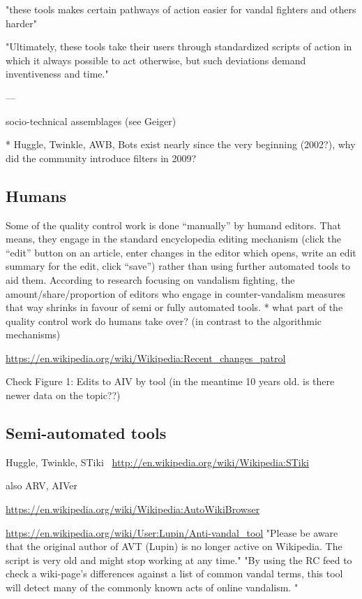 "these tools makes certain pathways of action easier for vandal
fighters and others harder"

"Ultimately, these tools take their users
through standardized scripts of action in which it always
possible to act otherwise, but such deviations demand
inventiveness and time."

---

socio-technical assemblages (see Geiger)

* Huggle, Twinkle, AWB, Bots exist nearly since the very beginning (2002?), why did the community introduce filters in 2009?

\subsection{Humans}

Some of the quality control work is done ``manually'' by humand editors.
That means, they engage in the standard encyclopedia editing mechanism (click the ``edit'' button on an article, enter changes in the editor which opens, write an edit summary for the edit, click ``save'') rather than using further automated tools to aid them.
According to research focusing on vandalism fighting, the amount/share/proportion of editors who engage in counter-vandalism measures that way shrinks in favour of semi or fully automated tools. %
* what part of the quality control work do humans take over? (in contrast to the algorithmic mechanisms)

\url{https://en.wikipedia.org/wiki/Wikipedia:Recent_changes_patrol}

\cite{GeiRib2010}
Check Figure 1: Edits to AIV by tool (in the meantime 10 years old. is there newer data on the topic??)

\subsection{Semi-automated tools}


Huggle, Twinkle, STiki~\cite{WestKanLee2010}
\url{http://en.wikipedia.org/wiki/Wikipedia:STiki}

also ARV, AIVer

\url{https://en.wikipedia.org/wiki/Wikipedia:AutoWikiBrowser}

\url{https://en.wikipedia.org/wiki/User:Lupin/Anti-vandal_tool}
"Please be aware that the original author of AVT (Lupin) is no longer active on Wikipedia. The script is very old and might stop working at any time."
"By using the RC feed to check a wiki-page's differences against a list of common vandal terms, this tool will detect many of the commonly known acts of online vandalism. "

